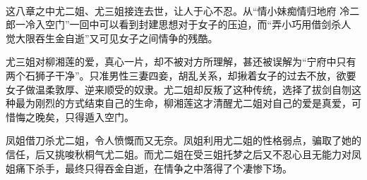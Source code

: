 %
\begin{solution}
    \

    \large 这八章之中尤二姐、尤三姐接连去世，让人于心不忍。从“情小妹痴情归地府 冷二郎一冷入空门”一回中可以看到封建思想对于女子的压迫，而“弄小巧用借剑杀人 觉大限吞生金自逝”又可见女子之间情争的残酷。

    尤三姐对柳湘莲的爱，真心一片，却不被对方所理解，甚还被误解为“宁府中只有两个石狮子干净”。只准男性三妻四妾，胡乱关系，却揪着女子的过去不放，欲要女子做温柔敦厚、逆来顺受的奴隶。尤二姐却反叛了这种传统，选择了拔剑自刎这种最为刚烈的方式结束自己的生命，柳湘莲这才清醒尤二姐对自己的爱是真爱，可惜悔之晚矣，只得遁入空门。

    凤姐借刀杀尤二姐，令人愤慨而又无奈。凤姐利用尤二姐的性格弱点，骗取了她的信任，后又挑唆秋桐气尤二姐。而尤二姐在受三姐托梦之后又不忍心且无能力对凤姐痛下杀手，最终只得吞金自逝，在情争之中落得了个凄惨下场。
\end{solution}


%



%



%



